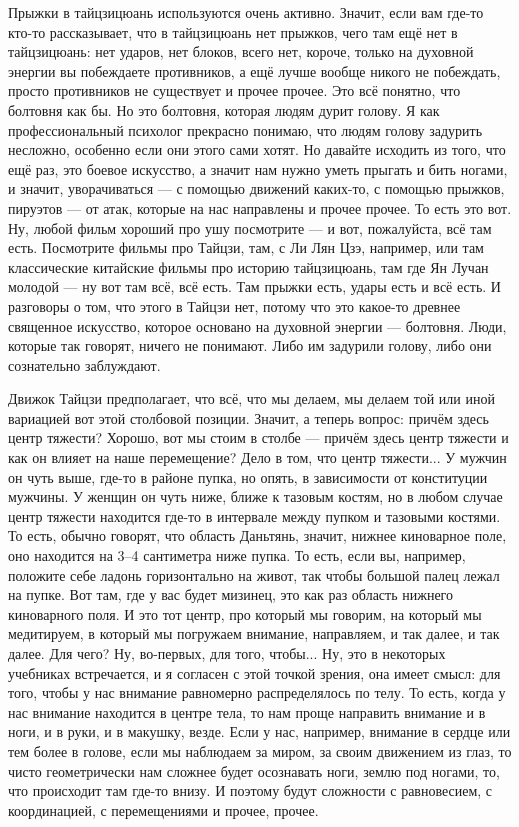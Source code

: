 Прыжки в тайцзицюань используются
очень активно. Значит, если вам где-то кто-то рассказывает, что в тайцзицюань нет прыжков, чего
там ещё нет в тайцзицюань: нет ударов, нет блоков, всего нет, короче, только на духовной
энергии вы побеждаете противников, а ещё лучше вообще никого не побеждать, просто противников
не существует и прочее прочее. Это всё понятно, что болтовня как бы. Но это болтовня, которая
людям дурит голову. Я как профессиональный психолог прекрасно понимаю, что людям голову
задурить несложно, особенно если они этого сами хотят. Но давайте исходить из того, что
ещё раз, это боевое искусство, а значит нам нужно уметь прыгать и бить ногами, и значит,
уворачиваться --- с помощью движений каких-то, с помощью прыжков, пируэтов --- от атак, которые на
нас направлены и прочее прочее. То есть это вот. Ну, любой фильм хороший про ушу посмотрите --- и
вот, пожалуйста, всё там есть. Посмотрите фильмы про Тайцзи, там, с Ли Лян Цзэ, например, или там
классические китайские фильмы про историю тайцзицюань, там где Ян
Лучан молодой --- ну вот там всё, всё есть. Там прыжки есть, удары есть и всё есть. И разговоры о
том, что этого в Тайцзи нет, потому что это какое-то древнее священное искусство, которое основано
на духовной энергии --- болтовня. Люди, которые так говорят, ничего не понимают. Либо им задурили
голову, либо они сознательно заблуждают.

Движок Тайцзи предполагает, что всё, что мы делаем, мы
делаем той или иной вариацией вот этой столбовой позиции. Значит, а теперь вопрос: причём здесь
центр тяжести? Хорошо, вот мы стоим в столбе --- причём здесь центр тяжести и как он влияет на
наше перемещение? Дело в том, что центр тяжести... У мужчин он чуть выше, где-то в районе пупка,
но опять, в зависимости от конституции мужчины. У женщин он чуть ниже, ближе к тазовым костям, но
в любом случае центр
тяжести находится где-то в интервале между пупком и тазовыми костями. То есть, обычно говорят,
что область Даньтянь, значит, нижнее киноварное поле, оно находится на 3--4 сантиметра ниже пупка.
То есть, если вы, например, положите себе ладонь горизонтально на живот, так чтобы большой палец
лежал на пупке. Вот там, где у вас будет мизинец, это как раз область нижнего киноварного поля.
И это
тот центр, про который мы говорим, на который мы медитируем, в который мы погружаем внимание,
направляем, и так далее, и так далее. Для чего? Ну,
во-первых, для того, чтобы... Ну, это в некоторых учебниках встречается, и я согласен с этой
точкой зрения, она имеет смысл: для того, чтобы у нас внимание равномерно распределялось по
телу. То есть, когда у нас внимание находится в центре тела, то нам проще направить внимание и
в ноги, и в руки, и в макушку, везде. Если у нас, например, внимание в сердце или тем более в
голове, если мы наблюдаем за миром, за своим движением из глаз, то чисто геометрически нам
сложнее будет осознавать ноги, землю под ногами, то, что происходит там где-то внизу. И поэтому
будут сложности с равновесием, с координацией, с перемещениями и прочее, прочее.

